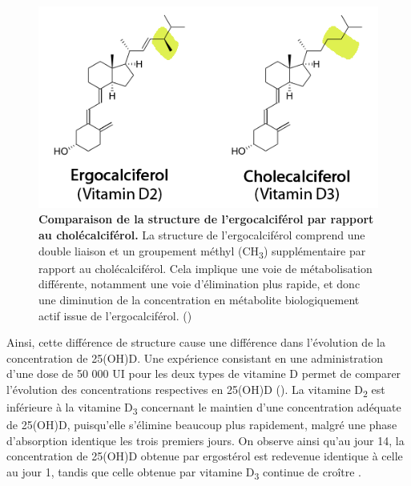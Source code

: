 \documentclass[
  a4paper,
  DIV=11,
  numbers=noendperiod,
  listof=totoc]{scrreprt}
\begin{document}
\begin{figure}
\includegraphics{figures/ergo_vs_chole.png} 
\caption[\textbf{Comparaison de la structure de l'ergocalciférol par rapport au cholécalciférol.}]
{\textbf{Comparaison de la structure de l'ergocalciférol par rapport au cholécalciférol.} La structure de l'ergocalciférol comprend une double liaison et un groupement méthyl (CH\textsubscript{3}) supplémentaire par rapport au cholécalciférol. Cela implique une voie de métabolisation différente, notamment une voie d'élimination plus rapide, et donc une diminution de la concentration en métabolite biologiquement actif issue de l'ergocalciférol. (\cite{Houghton.2006})}
\label{fig:ergo-struc}
\end{figure}

Ainsi, cette différence de structure cause une différence dans
l'évolution de la concentration de 25(OH)D. Une expérience consistant en
une administration d'une dose de 50 000 UI pour les deux types de
vitamine D permet de comparer l'évolution des concentrations respectives
en 25(OH)D (). La vitamine D\textsubscript{2} est
inférieure à la vitamine D\textsubscript{3} concernant le maintien d'une
concentration adéquate de 25(OH)D, puisqu'elle s'élimine beaucoup plus
rapidement, malgré une phase d'absorption identique les trois premiers
jours. On observe ainsi qu'au jour 14, la concentration de 25(OH)D
obtenue par ergostérol est redevenue identique à celle au jour 1, tandis
que celle obtenue par vitamine D\textsubscript{3} continue de croître
\autocite{Armas.2004}.
\end{document}
